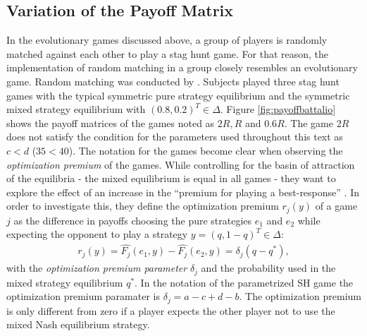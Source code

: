 \subsection{Variation of the Payoff Matrix}
In the evolutionary games discussed above, a group of players is randomly
matched against each other to play a stag hunt game. For that reason, the
implementation of random matching in a group closely resembles an 
evolutionary game.
Random matching was conducted by \textcite{battalio_optimization_2001}. 
Subjects played three stag hunt games with the typical symmetric pure strategy
equilibrium and the symmetric mixed strategy equilibrium with $(0.8,0.2)^T \in
\Delta$. Figure \ref{fig:payoffbattalio} shows the payoff matrices of the
games noted as $2R, R$ and $0.6R$. The game $2R$ does not satisfy the
condition for the parameters used throughout this text as $c<d$ ($35<40$).
The notation for the games become clear when observing the 
\textit{optimization premium} of the games. While controlling for the basin of 
attraction of the equilibria - the mixed equilibrium is equal in all games -
they want to explore the effect of an increase in the ``premium for playing
a best-response'' \parencite[751]{battalio_optimization_2001}. 
In order to investigate this, they define the optimization premium $r_j(y)$ of 
a game $j$ as the difference in payoffs choosing the pure strategies 
$e_1$ and $e_2$ while expecting the opponent to play a strategy 
$y=(q,1-q)^T \in \Delta$:
\begin{align}
        r_j(y)= \hat{F_j}(e_1,y) - \hat{F_j}(e_2,y) = \delta_j(q-q^*),
\end{align}
with the \textit{optimization premium parameter} $\delta_j$ and the 
probability used in the mixed strategy equilibrium $q^*$. In the notation
of the parametrized SH game the optimization premium paramater is 
$\delta_j = a - c + d - b$. The optimization
premium is only different from zero if a player expects the other player not
to use the mixed Nash equilibrium strategy.


